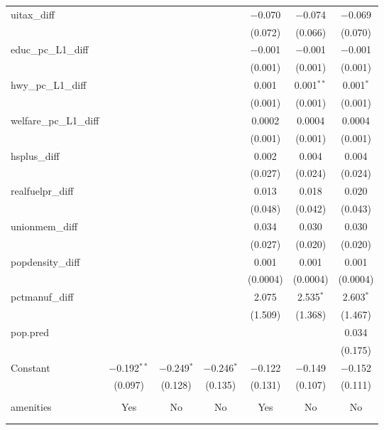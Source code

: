 \begin{table}[!htbp]
\begin{tabular}{@{\extracolsep{5pt}}lcccccc}
  uitax\_diff &  &  &  & $-$0.070 & $-$0.074 & $-$0.069 \\ 
  &  &  &  & (0.072) & (0.066) & (0.070) \\ 
  educ\_pc\_L1\_diff &  &  &  & $-$0.001 & $-$0.001 & $-$0.001 \\ 
  &  &  &  & (0.001) & (0.001) & (0.001) \\ 
  hwy\_pc\_L1\_diff &  &  &  & 0.001 & 0.001$^{**}$ & 0.001$^{*}$ \\ 
  &  &  &  & (0.001) & (0.001) & (0.001) \\ 
  welfare\_pc\_L1\_diff &  &  &  & 0.0002 & 0.0004 & 0.0004 \\ 
  &  &  &  & (0.001) & (0.001) & (0.001) \\ 
  hsplus\_diff &  &  &  & 0.002 & 0.004 & 0.004 \\ 
  &  &  &  & (0.027) & (0.024) & (0.024) \\ 
  realfuelpr\_diff &  &  &  & 0.013 & 0.018 & 0.020 \\ 
  &  &  &  & (0.048) & (0.042) & (0.043) \\ 
  unionmem\_diff &  &  &  & 0.034 & 0.030 & 0.030 \\ 
  &  &  &  & (0.027) & (0.020) & (0.020) \\ 
  popdensity\_diff &  &  &  & 0.001 & 0.001 & 0.001 \\ 
  &  &  &  & (0.0004) & (0.0004) & (0.0004) \\ 
  pctmanuf\_diff &  &  &  & 2.075 & 2.535$^{*}$ & 2.603$^{*}$ \\ 
  &  &  &  & (1.509) & (1.368) & (1.467) \\ 
  pop.pred &  &  &  &  &  & 0.034 \\ 
  &  &  &  &  &  & (0.175) \\ 
  Constant & $-$0.192$^{**}$ & $-$0.249$^{*}$ & $-$0.246$^{*}$ & $-$0.122 & $-$0.149 & $-$0.152 \\ 
  & (0.097) & (0.128) & (0.135) & (0.131) & (0.107) & (0.111) \\ 
 \hline \\[-1.8ex] 
amenities & Yes & No & No & Yes & No & No \\ 
\hline \\[-1.8ex] 
\hline 
\hline \\[-1.8ex] 
\end{tabular} 
\end{table} 
